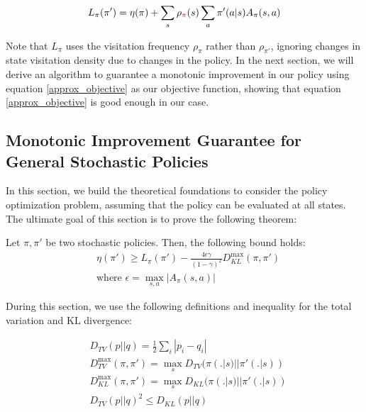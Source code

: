 \begin{align}\label{approx_objective}
    L_{\pi}(\pi') = \eta(\pi) + \sum_{s}\rho_{\textcolor{red}{\pi}}(s)\sum_{a}\pi'(a|s)A_{\pi}(s, a)
\end{align}

Note that $L_{\pi}$ uses the visitation frequency $\rho_{\pi}$ rather than $\rho_{\pi'}$, ignoring changes in state visitation density due to changes in the policy. In the next section, we will derive an algorithm to guarantee a monotonic improvement in our policy using equation \ref{approx_objective} as our objective function, showing that equation \ref{approx_objective} is good enough in our case.\\
{}

\subsection{Monotonic Improvement Guarantee for General Stochastic Policies}

In this section, we build the theoretical foundations to consider the policy optimization problem, assuming that the policy can be evaluated at all states. The ultimate goal of this section is to prove the following theorem:

\begin{theorem}\label{thm:policy-bound}
    Let $\pi, \pi'$ be two stochastic policies. Then, the following bound holds:
    \begin{align*}
    &\eta(\pi') \ge L_{\pi}(\pi') - \frac{4\epsilon\gamma}{(1-\gamma)^2}D_{KL}^{\max}(\pi, \pi') \\
    &\text{where } \epsilon = \max_{s, a} |A_{\pi}(s, a)|
    \end{align*}
\end{theorem}

During this section, we use the following definitions and inequality for the total variation and KL divergence:

\begin{align*}
    &D_{TV}(p||q) = \frac{1}{2}\sum_{i}|p_i - q_i| \\
    &D_{TV}^{\max}(\pi, \pi') = \max_{s} D_{TV}(\pi(.|s)||\pi'(.|s))\\
    &D_{KL}^{\max}(\pi, \pi') = \max_{s} D_{KL}(\pi(.|s)||\pi'(.|s))\\
    &D_{TV}(p||q)^2 \le D_{KL}(p||q)
\end{align*}

